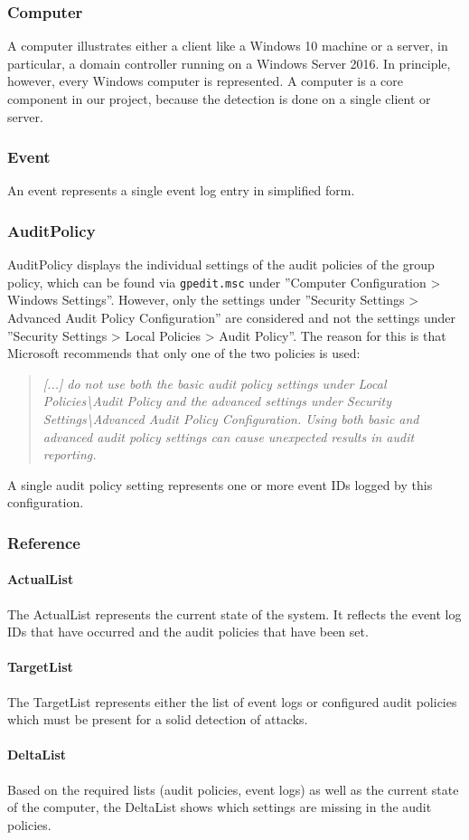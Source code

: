 \subsubsection{Computer}
A computer illustrates either a client like a Windows 10 machine or a server, in particular, a domain controller running on a Windows Server 2016. In principle, however, every Windows computer is represented. A computer is a core component in our project, because the detection is done on a single client or server. 

\subsubsection{Event}
An event represents a single event log entry in simplified form.

\subsubsection{AuditPolicy}\label{DomainModelAuditPolicy}
AuditPolicy displays the individual settings of the audit policies of the group policy, which can be found via \lstinline|gpedit.msc| under ''Computer Configuration > Windows Settings''. However, only the settings under ''Security Settings > Advanced Audit Policy Configuration'' are considered and not the settings under ''Security Settings > Local Policies > Audit Policy''. The reason for this is that Microsoft recommends that only one of the two policies is used:
\begin{quotation}
    \textit{[...] do not use both the basic audit policy settings under Local Policies\textbackslash Audit Policy and the advanced settings under Security Settings\textbackslash Advanced Audit Policy Configuration. Using both basic and advanced audit policy settings can cause unexpected results in audit reporting.} \cite{AdvancedSecurityAuditing}
\end{quotation}
A single audit policy setting represents one or more event IDs logged by this configuration.

\subsubsection{Reference}
\paragraph{ActualList}
The ActualList represents the current state of the system. It reflects the event log IDs that have occurred and the audit policies that have been set.

\paragraph{TargetList}
The TargetList represents either the list of event logs or configured audit policies which must be present for a solid detection of attacks.

\paragraph{DeltaList}
Based on the required lists (audit policies, event logs) as well as the current state of the computer, the DeltaList shows which settings are missing in the audit policies.